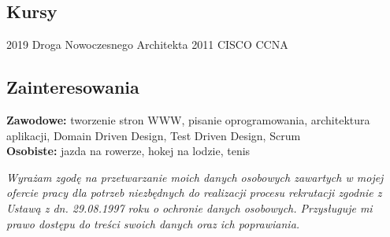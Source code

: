 \documentclass[]{friggeri-cv} %
\begin{document}
	\begin{absolutelynopagebreak}
		\section{Kursy}
		\begin{entrylist}
			\cert
			{2019}
			{Droga Nowoczesnego Architekta}
			\cert
			{2011}
			{CISCO CCNA}
		\end{entrylist}
	\end{absolutelynopagebreak}
	
	\begin{absolutelynopagebreak}
		\section{Zainteresowania}
		\textbf{Zawodowe: } tworzenie stron WWW, pisanie oprogramowania, architektura aplikacji, Domain Driven Design, Test Driven Design, Scrum\\
		\textbf{Osobiste: } jazda na rowerze, hokej na lodzie, tenis
	\end{absolutelynopagebreak}
	
	\vfill
	\textit{Wyrażam zgodę na przetwarzanie moich danych osobowych zawartych w mojej ofercie pracy dla potrzeb niezbędnych do realizacji procesu rekrutacji zgodnie z Ustawą z dn. 29.08.1997 roku o ochronie danych osobowych. Przysługuje mi prawo dostępu do treści swoich danych oraz ich poprawiania.}
\end{document}
